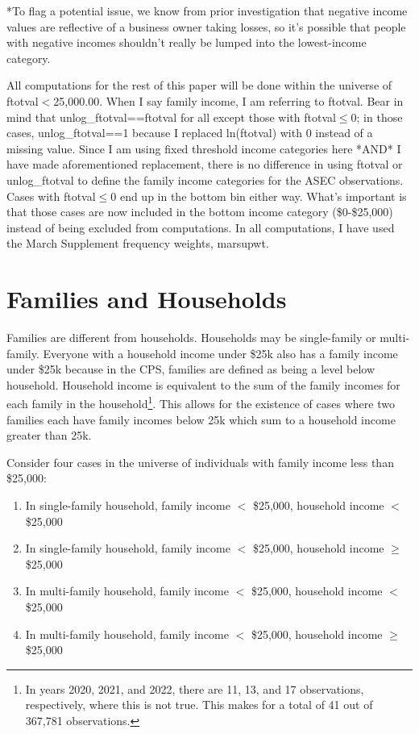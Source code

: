 \documentclass{article}
\begin{document}
	*To flag a potential issue, we know from prior investigation that negative income values are reflective of a business owner taking losses, so it's possible that people with negative incomes shouldn't really be lumped into the lowest-income category.
	
	All computations for the rest of this paper will be done within the universe of ftotval$<$25,000.00. When I say family income, I am referring to ftotval. Bear in mind that unlog\_ftotval==ftotval for all except those with ftotval$\le$0; in those cases, unlog\_ftotval==1 because I replaced ln(ftotval) with 0 instead of a missing value. Since I am using fixed threshold income categories here *AND* I have made aforementioned replacement, there is no difference in using ftotval or unlog\_ftotval to define the family income categories for the ASEC observations. Cases with ftotval$\le$0 end up in the bottom bin either way. What's important is that those cases are now included in the bottom income category (\$0-\$25,000) instead of being excluded from computations. In all computations, I have used the March Supplement frequency weights, marsupwt.
	
	\section{Families and Households} Families are different from households. Households may be single-family or multi-family. Everyone with a household income under \$25k also has a family income under \$25k because in the CPS, families are defined as being a level below household. Household income is equivalent to the sum of the family incomes for each family in the household\footnote{In years 2020, 2021, and 2022, there are 11, 13, and 17 observations, respectively, where this is not true. This makes for a total of 41 out of 367,781 observations.}. This allows for the existence of cases where two families each have family incomes below 25k which sum to a household income greater than 25k. 
	
	Consider four cases in the universe of individuals with family income less than \$25,000:
	
	\begin{enumerate}
		\item In single-family household, family income $<$ \$25,000, household income $<$ \$25,000 
		\item In single-family household, family income $<$ \$25,000, household income $\ge$ \$25,000 
		\item In multi-family household, family income $<$ \$25,000, household income $<$ \$25,000
		\item In multi-family household, family income $<$ \$25,000, household income $\ge$ \$25,000
	\end{enumerate}
	
\end{document}
